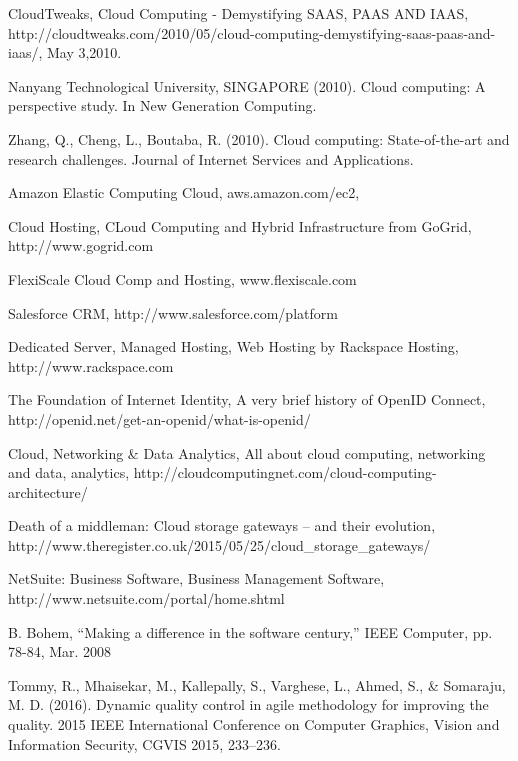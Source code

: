 \documentclass[runningheads,a4paper]{llncs}
\begin{document}
\begin{thebibliography}{9}

  CloudTweaks,
  Cloud Computing - Demystifying SAAS, PAAS AND IAAS,
  http://cloudtweaks.com/2010/05/cloud-computing-demystifying-saas-paas-and-iaas/,
  May 3,2010.
  
Nanyang Technological University, SINGAPORE (2010). Cloud computing: A perspective study. In New Generation Computing. 

Zhang, Q., Cheng, L., Boutaba, R. (2010). Cloud computing: State-of-the-art and research challenges. Journal of Internet Services and Applications.


Amazon Elastic Computing Cloud, aws.amazon.com/ec2,

Cloud Hosting, CLoud Computing and Hybrid Infrastructure from GoGrid, http://www.gogrid.com

FlexiScale Cloud Comp and Hosting, www.flexiscale.com

Salesforce CRM, http://www.salesforce.com/platform

Dedicated Server, Managed Hosting, Web Hosting by Rackspace Hosting, http://www.rackspace.com

The Foundation of Internet Identity, A very brief history of OpenID Connect, http://openid.net/get-an-openid/what-is-openid/

Cloud, Networking \& Data Analytics,
All about cloud computing, networking and data, analytics, http://cloudcomputingnet.com/cloud-computing-architecture/

Death of a middleman: Cloud storage gateways – and their evolution, http://www.theregister.co.uk/2015/05/25/cloud\_storage\_gateways/

NetSuite: Business Software, Business Management Software, http://www.netsuite.com/portal/home.shtml

 B. Bohem, “Making a difference in the software century,” IEEE Computer, pp. 78-84, Mar. 2008
 
Tommy, R., Mhaisekar, M., Kallepally, S., Varghese, L., Ahmed, S., \& Somaraju, M. D. (2016). Dynamic quality control in agile methodology for improving the quality. 2015 IEEE International Conference on Computer Graphics, Vision and Information Security, CGVIS 2015, 233–236.


\end{thebibliography}
\end{document}
